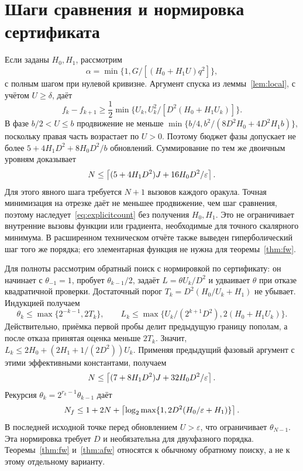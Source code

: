 \section{Шаги сравнения и нормировка сертификата}
\label{app:explicit}
Если заданы $H_0,H_1$, рассмотрим
\[
 \alpha=\min\{1,G/[(H_0+H_1U)q^2]\},
\]
с полным шагом при нулевой кривизне. Аргумент спуска из
леммы~\ref{lem:local}, с учётом $U\ge\delta$, даёт
\[
 f_k-f_{k+1}\ge\frac12\min\{U_k,U_k^2/[D^2(H_0+H_1U_k)]\}.
\]
В фазе $b/2<U\le b$ продвижение не меньше
$\min\{b/4,b^2/(8D^2H_0+4D^2H_1b)\}$, поскольку правая часть
возрастает по $U>0$. Поэтому бюджет фазы допускает не более
$5+4H_1D^2+8H_0D^2/b$ обновлений. Суммирование по тем же
двоичным уровням доказывает
\begin{equation}\label{eq:explicitcount}
 N\le\left\lceil(5+4H_1D^2)J+16H_0D^2/\varepsilon\right\rceil.
\end{equation}
Для этого явного шага требуется $N+1$ вызовов каждого оракула.
Точная минимизация на отрезке даёт не меньшее продвижение, чем шаг
сравнения, поэтому наследует~\eqref{eq:explicitcount} без получения
$H_0,H_1$. Это не ограничивает внутренние вызовы функции или
градиента, необходимые для точного скалярного минимума. В расширенном
техническом отчёте также выведен гиперболический шаг того же порядка;
его элементарная функция не нужна для теоремы~\ref{thm:fw}.

Для полноты рассмотрим обратный поиск с нормировкой по сертификату:
он начинает с $\theta_{-1}=1$, пробует $\theta_{k-1}/2$, задаёт
$L=\theta U_k/D^2$ и удваивает $\theta$ при отказе квадратичной
проверки. Достаточный порог $T_k=D^2(H_0/U_k+H_1)$ не убывает.
Индукцией получаем
\[
 \theta_k\le\max\{2^{-k-1},2T_k\},\qquad
 L_k\le\max\{U_k/(2^{k+1}D^2),2(H_0+H_1U_k)\}.
\]
Действительно, приёмка первой пробы делит предыдущую границу пополам,
а после отказа принятая оценка меньше $2T_k$.
Значит, $L_k\le2H_0+(2H_1+1/(2D^2))U_k$. Применяя предыдущий
фазовый аргумент с этими эффективными константами, получаем
\[
 N\le\left\lceil(7+8H_1D^2)J+32H_0D^2/\varepsilon\right\rceil.
\]
Рекурсия $\theta_k=2^{r_k-1}\theta_{k-1}$ даёт
\[
 N_f\le1+2N+\left\lceil\log_2\max\{1,2D^2(H_0/\varepsilon+H_1)\}\right\rceil.
\]
В последней исходной точке перед обновлением $U>\varepsilon$,
что ограничивает $\theta_{N-1}$. Эта нормировка требует $D$ и
необязательна для двухфазного порядка. Теоремы~\ref{thm:fw}
и~\ref{thm:afw} относятся к обычному обратному поиску, а не к этому
отдельному варианту.


